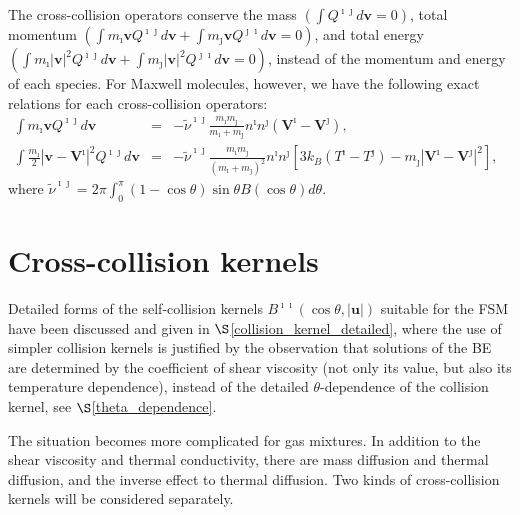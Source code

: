 The cross-collision operators conserve the mass $(\int Q^{\imath\jmath}{d\textbf{v}}=0)$, total momentum $(\int m_\imath{\textbf{v}}Q^{\imath\jmath}{d\textbf{v}} +\int m_\jmath{\textbf{v}}Q^{\jmath\imath}{d\textbf{v}}=0)$, and total energy $(\int m_\imath|\textbf{v}|^2Q^{\imath\jmath}{d\textbf{v}} +\int m_\jmath|\textbf{v}|^2Q^{\jmath\imath}{d\textbf{v}}=0)$, instead of the momentum and energy of each species. For Maxwell molecules, however, we have the following exact relations for each cross-collision operators:
\begin{eqnarray}
  \int m_\imath \textbf{v} Q^{\imath\jmath}d\textbf{v}&=& -\tilde{\nu}^{\imath\jmath}\frac{m_\imath{}m_\jmath}{m_\imath+m_\jmath}n^\imath{n^\jmath}(\textbf{V}^\imath-\textbf{V}^\jmath), \label{cross_relation_V} \\
  \int \frac{m_\imath}{2} |\textbf{v}-\textbf{V}^\imath|^2 Q^{\imath\jmath}d\textbf{v} &=&
  -\tilde{\nu}^{\imath\jmath}\frac{m_\imath{}m_\jmath}{(m_\imath+m_\jmath)^2}n^\imath{n^\jmath}[3k_B(T^\imath-T^\jmath)-m_\jmath|\textbf{V}^\imath-\textbf{V}^\jmath|^2], \ \ \ \ \ 
  \label{cross_relation_T}
\end{eqnarray}
where $
    \tilde{\nu}^{\imath\jmath}=2\pi\int_0^\pi    (1-\cos\theta)\sin\theta{}B(\cos\theta){d\theta}$.

\section{Cross-collision kernels}

Detailed forms of the self-collision kernels $B^{\imath\imath}(\cos\theta,|\textbf{u}|)$ suitable for the FSM have been discussed and given in $\S$\ref{collision_kernel_detailed}, where the use of simpler collision kernels is justified by the observation that solutions of the BE are determined by the coefficient of shear viscosity (not only its value, but also its temperature dependence), instead of the detailed $\theta$-dependence of the collision kernel, see $\S$\ref{theta_dependence}. 


The situation becomes more complicated for gas mixtures. In addition to the shear viscosity and thermal conductivity, there are mass diffusion and thermal diffusion, and the inverse effect to thermal diffusion. Two kinds of cross-collision kernels will be considered separately. 


